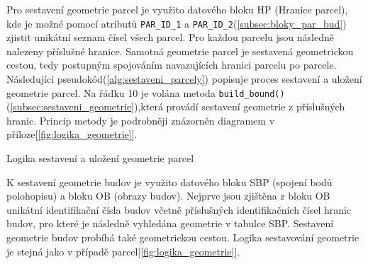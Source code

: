 Pro sestavení geometrie parcel je využito datového bloku HP (Hranice parcel), kde je možné pomocí atributů \verb|PAR_ID_1| a \verb|PAR_ID_2|(\ref{subsec:bloky_par_bud}) zjistit unikátní seznam čísel všech parcel. Pro každou parcelu jsou následně nalezeny příslušné hranice. Samotná geometrie parcel je sestavená geometrickou cestou, tedy postupným spojováním navazujících hranici parcelu po parcele. Následující pseudokód(\ref{alg:sestaveni_parcely}) popisuje proces sestavení a uložení geometrie parcel. Na řádku 10 je volána metoda \verb|build_bound()|(\ref{subsec:sestaveni_geometrie}),která provádí sestavení geometrie z příslušných hranic. Princip metody je podrobněji znázorněn diagramem v příloze[\ref{fig:logika_geometrie}].

\begin{algorithm}
\caption{Logika sestavení a uložení geometrie parcel}
\label{alg:sestaveni_parcely}
	\begin{algorithmic}[1]
		\ENDFOR
		\ELSE
		\ENDIF
	\ENDFOR
	\end{algorithmic}
\end{algorithm}

K sestavení geometrie budov je využito datového bloku SBP (spojení bodů polohopisu) a bloku OB (obrazy budov). Nejprve jsou zjištěna z bloku OB unikátní identifikační čísla budov včetně příslušných identifikačních čísel hranic budov, pro které je následně vyhledána geometrie v tabulce SBP. Sestavení geometrie budov probíhá také geometrickou cestou. Logika sestavování geometrie je stejná jako v případě parcel[\ref{fig:logika_geometrie}].

